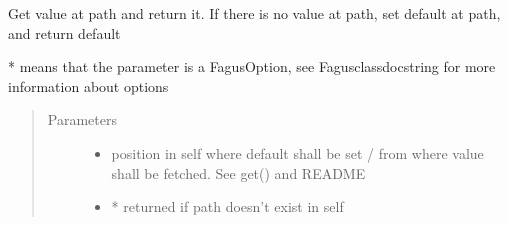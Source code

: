 \documentclass[a4paper,10pt,english]{sphinxmanual}
\begin{document}
\begin{fulllineitems}
\begin{fulllineitems}
\label{\detokenize{fagus.fagus:fagus.fagus.Fagus.setdefault}}
\pysigstartsignatures
{}
\pysigstopsignatures
\sphinxAtStartPar
Get value at path and return it. If there is no value at path, set default at path, and return default

\sphinxAtStartPar
* means that the parameter is a FagusOption, see Fagus\sphinxhyphen{}class\sphinxhyphen{}docstring for more information about options
\begin{quote}\begin{description}
\item[{Parameters}] \leavevmode\begin{itemize}
\item {}
\sphinxAtStartPar
{} \textendash{} position in self where default shall be set / from where value shall be fetched. See get() and README

\item {}
\sphinxAtStartPar
{} \textendash{} * returned if path doesn’t exist in self


\end{itemize}
\end{description}
\end{quote}
\end{fulllineitems}
\end{fulllineitems}
\end{document}
